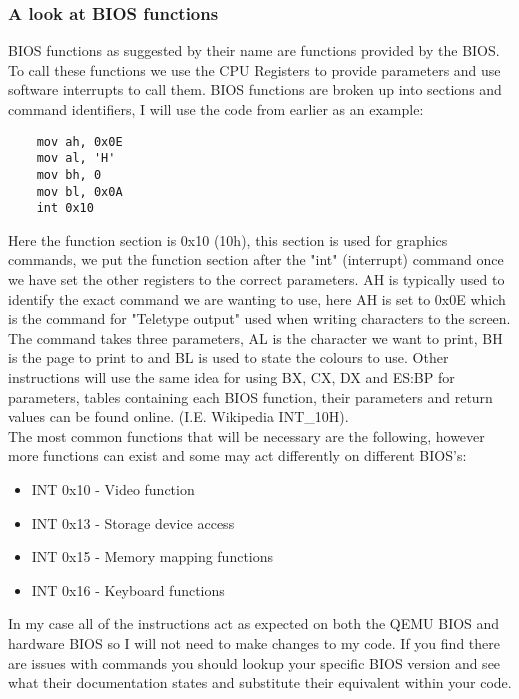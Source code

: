 \documentclass[10pt,a4paper]{article}
\begin{document}
\newpage
\subsubsection{A look at BIOS functions}
BIOS functions as suggested by their name are functions provided by the BIOS. To call these functions we use the CPU Registers to provide parameters and use software interrupts to call them. BIOS functions are broken up into sections and command identifiers, I will use the code from earlier as an example:
\begin{verbatim}
	mov ah, 0x0E
	mov al, 'H'
	mov bh, 0
	mov bl, 0x0A
	int 0x10
\end{verbatim}
Here the function section is 0x10 (10h), this section is used for graphics commands, we put the function section after the "int" (interrupt) command once we have set the other registers to the correct parameters. AH is typically used to identify the exact command we are wanting to use, here AH is set to 0x0E which is the command for "Teletype output" used when writing characters to the screen. The command takes three parameters, AL is the character we want to print, BH is the page to print to and BL is used to state the colours to use. Other instructions will use the same idea for using BX, CX, DX and ES:BP for parameters, tables containing each BIOS function, their parameters and return values can be found online. (I.E. Wikipedia INT\_10H).
\medskip 
\\The most common functions that will be necessary are the following, however more functions can exist and some may act differently on different BIOS's:
\begin{itemize}
\item INT 0x10 - Video function
\item INT 0x13 - Storage device access
\item INT 0x15 - Memory mapping functions
\item INT 0x16 - Keyboard functions
\end{itemize}
In my case all of the instructions act as expected on both the QEMU BIOS and hardware BIOS so I will not need to make changes to my code. If you find there are issues with commands you should lookup your specific BIOS version and see what their documentation states and substitute their equivalent within your code.

\newpage
\end{document}
